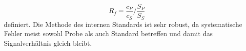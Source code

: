       \begin{equation}
        R_f = \frac{c_{P}}{c_{S}} / \frac{S_{P}}{S_{S}}
      \end{equation}
    definiert. Die Methode des internen Standards ist sehr robust, da systematische Fehler meist sowohl Probe als auch Standard betreffen und damit das Signalverhältnis gleich bleibt. \citep{AnalytikIII} 
    
      